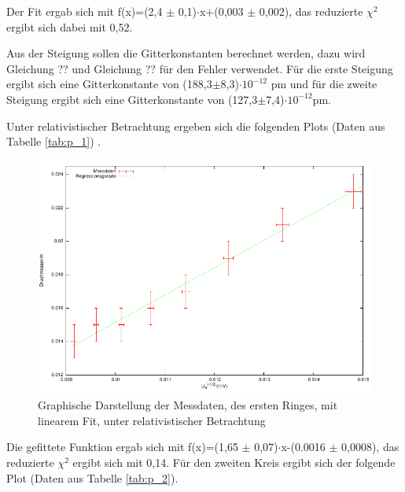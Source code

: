 \documentclass[12pt,a4paper]{article}
\begin{document}
Der Fit ergab sich mit f(x)=(2,4 $\pm$ 0,1)$\cdot$x+(0,003 $\pm$ 0,002), das reduzierte $\chi^2$ ergibt sich dabei mit 0,52.

Aus der Steigung sollen die Gitterkonstanten berechnet werden, dazu wird Gleichung ?? und Gleichung ?? für den Fehler verwendet. Für die erste Steigung ergibt sich eine Gitterkonstante von (188,3$\pm$8,3)$\cdot 10^{-12}$ pm und für die zweite Steigung ergibt sich eine Gitterkonstante von (127,3$\pm$7,4)$\cdot 10^{-12}$pm.

Unter relativistischer Betrachtung ergeben sich die folgenden Plots (Daten aus Tabelle \ref{tab:p_1}) .

\begin{figure}[H] 
  \centering
    \includegraphics[scale = 1]{kreis_1_r.pdf}
  	\caption[Graphische Darstellung der Messdaten, des ersten Ringes, mit linearem Fit, unter relativistischer Betrachtung]{Graphische Darstellung der Messdaten, des ersten Ringes, mit linearem Fit, unter relativistischer Betrachtung}
  \label{fig:plot_1}
\end{figure}

Die gefittete Funktion ergab sich mit f(x)=(1,65 $\pm$ 0,07)$\cdot$x-(0.0016 $\pm$ 0,0008), das reduzierte $\chi^2$ ergibt sich mit 0,14.
Für den zweiten Kreis ergibt sich der folgende Plot (Daten aus Tabelle \ref{tab:p_2}).
\end{document}
